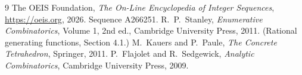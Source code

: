 \documentclass[11pt,a4paper]{article}
\theoremstyle{plain}
\theoremstyle{definition}
\begin{document}
\begin{thebibliography}{9}
 The OEIS Foundation, \emph{The On-Line Encyclopedia of Integer
Sequences}, \url{https://oeis.org}, 2026. Sequence A266251.
 R.~P.~Stanley, \emph{Enumerative Combinatorics}, Volume 1, 2nd ed.,
Cambridge University Press, 2011. (Rational generating functions, Section 4.1.)
 M.~Kauers and P.~Paule, \emph{The Concrete Tetrahedron}, Springer, 2011.
 P.~Flajolet and R.~Sedgewick, \emph{Analytic Combinatorics}, Cambridge
University Press, 2009.
\end{thebibliography}
\end{document}
